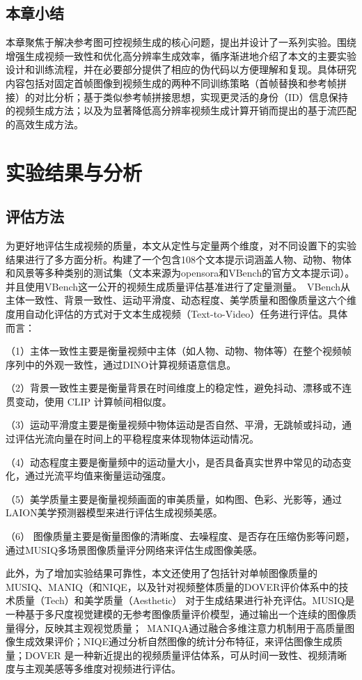 \subsection{本章小结}
本章聚焦于解决参考图可控视频生成的核心问题，提出并设计了一系列实验。围绕增强生成视频一致性和优化高分辨率生成效率，循序渐进地介绍了本文的主要实验设计和训练流程，并在必要部分提供了相应的伪代码以方便理解和复现。具体研究内容包括对固定首帧图像到视频生成的两种不同训练策略（首帧替换和参考帧拼接）的对比分析；基于类似参考帧拼接思想，实现更灵活的身份（ID）信息保持的视频生成方法；以及为显著降低高分辨率视频生成计算开销而提出的基于流匹配的高效生成方法。

\cleardoublepage
\section{实验结果与分析}
\subsection{评估方法}

为更好地评估生成视频的质量，本文从定性与定量两个维度，对不同设置下的实验结果进行了多方面分析。构建了一个包含108个文本提示词涵盖人物、动物、物体和风景等多种类别的测试集（文本来源为opensora和VBench的官方文本提示词）。并且使用VBench这一公开的视频生成质量评估基准进行了定量测量。\
VBench从主体一致性、背景一致性、运动平滑度、动态程度、美学质量和图像质量这六个维度用自动化评估的方式对于文本生成视频（Text-to-Video）任务进行评估。具体而言：

（1）主体一致性主要是衡量视频中主体（如人物、动物、物体等）在整个视频帧序列中的外观一致性，通过DINO计算视频语意信息。

（2）背景一致性主要是衡量背景在时间维度上的稳定性，避免抖动、漂移或不连贯变动，使用 CLIP 计算帧间相似度。

（3）运动平滑度主要是衡量视频中物体运动是否自然、平滑，无跳帧或抖动，通过评估光流向量在时间上的平稳程度来体现物体运动情况。

（4）动态程度主要是衡量频中的运动量大小，是否具备真实世界中常见的动态变化，通过光流平均值来衡量运动强度。

（5）美学质量主要是衡量视频画面的审美质量，如构图、色彩、光影等，通过LAION美学预测器模型来进行评估生成视频美感。

（6） 图像质量主要是衡量图像的清晰度、去噪程度、是否存在压缩伪影等问题，通过MUSIQ多场景图像质量评分网络来评估生成图像美感。

此外，为了增加实验结果可靠性，本文还使用了包括针对单帧图像质量的MUSIQ\cite{ke2021musiq}、MANIQ\cite{maniqa}（和NIQE\cite{niqe}，以及针对视频整体质量的DOVER\cite{dover}评价体系中的技术质量（Tech）和美学质量（Aesthetic）
对于生成结果进行补充评估。MUSIQ是一种基于多尺度视觉建模的无参考图像质量评价模型，通过输出一个连续的图像质量得分，反映其主观视觉质量；\
MANIQA通过融合多维注意力机制用于高质量图像生成效果评价；NIQE通过分析自然图像的统计分布特征，来评估图像生成质量；DOVER 是一种新近提出的视频质量评估体系，可从时间一致性、视频清晰度与主观美感等多维度对视频进行评估。

